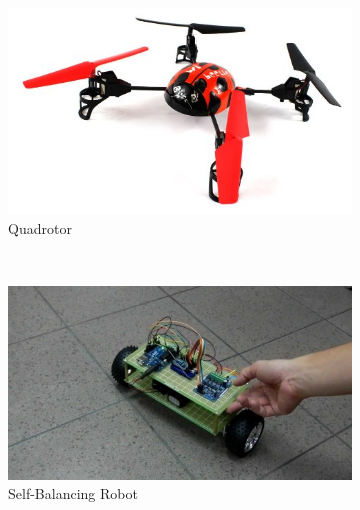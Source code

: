 \documentclass[a4paper,12 pt]{article}
\begin{document}
\begin{figure}[!h]
        \centering
        \begin{subfigure}[b]{0.3\textwidth}
                \includegraphics[width=\textwidth]{gyr3.jpg}
                \caption{Quadrotor}
                \label{fig:gull}
        \end{subfigure}%
        ~ %
        \begin{subfigure}[b]{0.3\textwidth}
                \includegraphics[width=\textwidth]{gyr4.jpg}
                \caption{Self-Balancing Robot}
                \label{fig:tiger}
        \end{subfigure}
        ~ %
        \begin{subfigure}[b]{0.3\textwidth}

\end{subfigure}
\end{figure}
\end{document}
